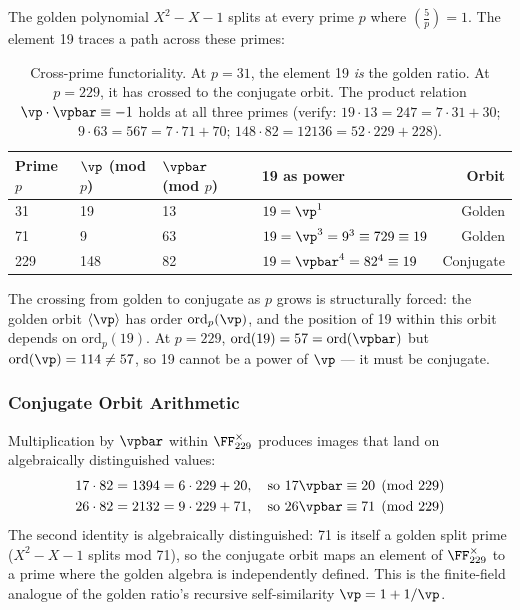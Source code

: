 The golden polynomial $X^2 - X - 1$ splits at every prime $p$ where $\left(\frac{5}{p}\right) = 1$. The element 19 traces a path across these primes:

\begin{table}[!ht]
\centering\small
\begin{tabular}{@{}llllr@{}}
\toprule
\textbf{Prime $p$} & \textbf{$\vp$ (mod $p$)} & \textbf{$\vpbar$ (mod $p$)} & \textbf{19 as power} & \textbf{Orbit} \\
\midrule
31  & 19 & 13 & $19 = \vp^1$ & Golden \\
71  & 9  & 63 & $19 = \vp^3 = 9^3 \equiv 729 \equiv 19$ & Golden \\
229 & 148 & 82 & $19 = \vpbar^4 = 82^4 \equiv 19$ & Conjugate \\
\bottomrule
\end{tabular}
\caption{Cross-prime functoriality. At $p = 31$, the element 19 \emph{is} the golden ratio. At $p = 229$, it has crossed to the conjugate orbit. The product relation $\vp \cdot \vpbar \equiv -1$ holds at all three primes (verify: $19 \cdot 13 = 247 = 7 \cdot 31 + 30$; $9 \cdot 63 = 567 = 7 \cdot 71 + 70$; $148 \cdot 82 = 12136 = 52 \cdot 229 + 228$).}
\end{table}

The crossing from golden to conjugate as $p$ grows is structurally forced: the golden orbit $\langle\vp\rangle$ has order $\mathrm{ord}_p(\vp)$, and the position of 19 within this orbit depends on $\mathrm{ord}_p(19)$. At $p = 229$, $\mathrm{ord}(19) = 57 = \mathrm{ord}(\vpbar)$ but $\mathrm{ord}(\vp) = 114 \neq 57$, so 19 cannot be a power of $\vp$ --- it must be conjugate.

\subsubsection*{Conjugate Orbit Arithmetic}

Multiplication by $\vpbar$ within $\FF_{229}^\times$ produces images that land on algebraically distinguished values:
\begin{align}
17 \cdot 82 &= 1394 = 6 \cdot 229 + 20, \quad\text{so } 17\vpbar \equiv 20 \pmod{229} \\
26 \cdot 82 &= 2132 = 9 \cdot 229 + 71, \quad\text{so } 26\vpbar \equiv 71 \pmod{229}
\end{align}
The second identity is algebraically distinguished: 71 is itself a golden split prime ($X^2 - X - 1$ splits mod 71), so the conjugate orbit maps an element of $\FF_{229}^\times$ to a prime where the golden algebra is independently defined. This is the finite-field analogue of the golden ratio's recursive self-similarity $\vp = 1 + 1/\vp$.

